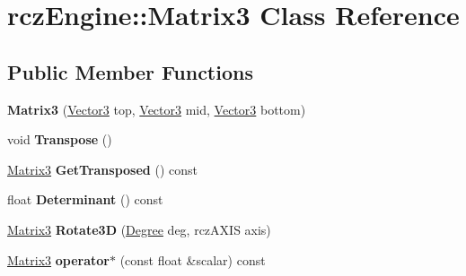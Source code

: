 \hypertarget{classrcz_engine_1_1_matrix3}{}\section{rcz\+Engine\+:\+:Matrix3 Class Reference}
\label{classrcz_engine_1_1_matrix3}
\subsection*{Public Member Functions}
\begin{DoxyCompactItemize}
\item 
\hypertarget{classrcz_engine_1_1_matrix3_a2cc2027c9cdc491236ea33d5302867d6}{}{\bfseries Matrix3} (\hyperlink{classrcz_engine_1_1_vector3}{Vector3} top, \hyperlink{classrcz_engine_1_1_vector3}{Vector3} mid, \hyperlink{classrcz_engine_1_1_vector3}{Vector3} bottom)\label{classrcz_engine_1_1_matrix3_a2cc2027c9cdc491236ea33d5302867d6}

\item 
\hypertarget{classrcz_engine_1_1_matrix3_aeb7ea1157f18db03720d8a0ee6a39f59}{}void {\bfseries Transpose} ()\label{classrcz_engine_1_1_matrix3_aeb7ea1157f18db03720d8a0ee6a39f59}

\item 
\hypertarget{classrcz_engine_1_1_matrix3_abc65f59e937791e6845c567882a7f0e1}{}\hyperlink{classrcz_engine_1_1_matrix3}{Matrix3} {\bfseries Get\+Transposed} () const \label{classrcz_engine_1_1_matrix3_abc65f59e937791e6845c567882a7f0e1}

\item 
\hypertarget{classrcz_engine_1_1_matrix3_ae029e0de4010d1995f872ee565838c11}{}float {\bfseries Determinant} () const \label{classrcz_engine_1_1_matrix3_ae029e0de4010d1995f872ee565838c11}

\item 
\hypertarget{classrcz_engine_1_1_matrix3_afb9f640799a1b05ab6633fdc772336d7}{}\hyperlink{classrcz_engine_1_1_matrix3}{Matrix3} {\bfseries Rotate3\+D} (\hyperlink{classrcz_engine_1_1_degree}{Degree} deg, rcz\+A\+X\+I\+S axis)\label{classrcz_engine_1_1_matrix3_afb9f640799a1b05ab6633fdc772336d7}

\item 
\hypertarget{classrcz_engine_1_1_matrix3_aff30cfe0c8abfd1f6fa45bfbdd69ce9a}{}\hyperlink{classrcz_engine_1_1_matrix3}{Matrix3} {\bfseries operator$\ast$} (const float \&scalar) const \label{classrcz_engine_1_1_matrix3_aff30cfe0c8abfd1f6fa45bfbdd69ce9a}


\end{DoxyCompactItemize}
